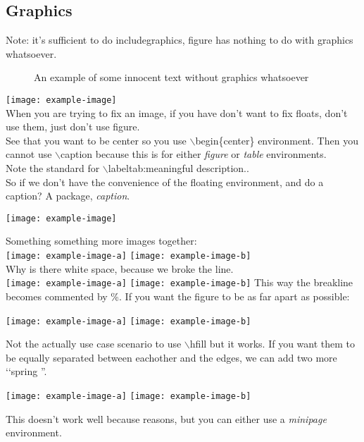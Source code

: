 \documentclass[11pt,a4paper,oneside,openany]{book}
\begin{document}
\subsection{Graphics}
Note: it's sufficient to do includegraphics, figure has nothing to do with graphics whatsoever. \\
\begin{figure}
    An example of some innocent text without graphics whatsoever
\end{figure}
\texttt{[image: example-image]}
\\ When you are trying to fix an image, if you have don't want to fix floats, don't use them, just don't use figure.
\\ See that you want to be center so you use \(\backslash\)begin\{center\} environment. Then you cannot use \(\backslash\)caption{} because this is for either \emph{figure} or \emph{table} environments.
\\ Note the standard for \(\backslash\)label{tab:meaningful description.}.
\\ So if we don't have the convenience of the floating environment, and do a caption? A package, \emph{caption}.\\ 
\begin{center}
    \texttt{[image: example-image]}
    \label{img:ahah}
\end{center}

Something something more images together: \\

\texttt{[image: example-image-a]}
\texttt{[image: example-image-b]}
\\ Why is there white space, because we broke the line. \\
\texttt{[image: example-image-a]}%
\texttt{[image: example-image-b]}
This way the breakline becomes commented by \%.
If you want the figure to be as far apart as possible:

\begin{center}
    \texttt{[image: example-image-a]}\hfill
    \texttt{[image: example-image-b]}
\end{center}
Not the actually use case scenario to use \(\backslash\)hfill but it works.
If you want them to be equally separated between eachother and the edges, we can add two more \lq\lq spring ''.
\begin{center}
    \hfill
    \texttt{[image: example-image-a]}\hfill
    \texttt{[image: example-image-b]} \hfill
\end{center}
This doesn't work well because reasons, but you can either use a \emph{minipage} environment. \\
\end{document}
